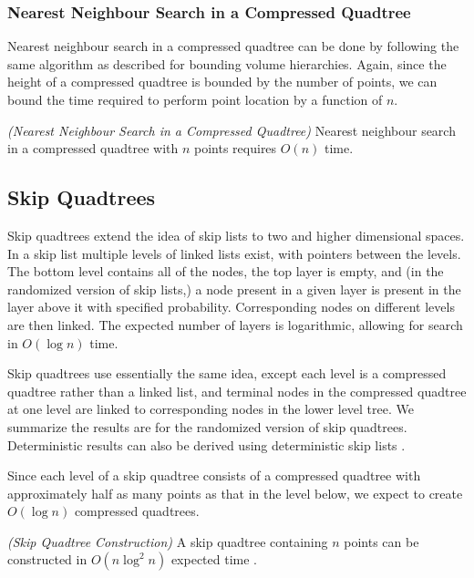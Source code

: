 \documentclass[mcs]{scsthesis}
\begin{document}
\subsubsection{Nearest Neighbour Search in a Compressed Quadtree}

Nearest neighbour search in a compressed quadtree can be done by following the
same algorithm as described for bounding volume hierarchies. Again, since the
height of a compressed quadtree is bounded by the number of points, we can bound
the time required to perform point location by a function of $n$.

\begin{thm} \emph{(Nearest Neighbour Search in a Compressed Quadtree)} 
Nearest neighbour search in a compressed quadtree with $n$ points requires
\(O(n)\) time.
\end{thm}

\subsection{Skip Quadtrees}

Skip quadtrees extend the idea of skip lists \cite{skiplist} to two and higher
dimensional spaces. In a skip list multiple levels of linked lists exist, with
pointers between the levels. The bottom level contains all of the nodes, the
top layer is empty, and (in the randomized version of skip lists,) a node
present in a given layer is present in the layer above it with specified
probability. Corresponding nodes on different levels are then linked. The
expected number of layers is logarithmic, allowing for search in \(O(\log n)\)
time.

Skip quadtrees use essentially the same idea, except each level is a
compressed quadtree rather than a linked list, and terminal nodes in the
compressed quadtree at one level are linked to corresponding nodes in the
lower level tree. We summarize the results are for the randomized version of
skip quadtrees. Deterministic results can also be derived using deterministic
skip lists \cite{skipquadtree}.

Since each level of a skip quadtree consists of a compressed quadtree with
approximately half as many points as that in the level below, we expect to
create \(O(\log n)\) compressed quadtrees.

\begin{thm} \emph{(Skip Quadtree Construction)}
A skip quadtree containing $n$ points can be constructed in \(O(n \log^2 n)\)
expected time \cite{skipquadtree}.
\end{thm}
\end{document}
